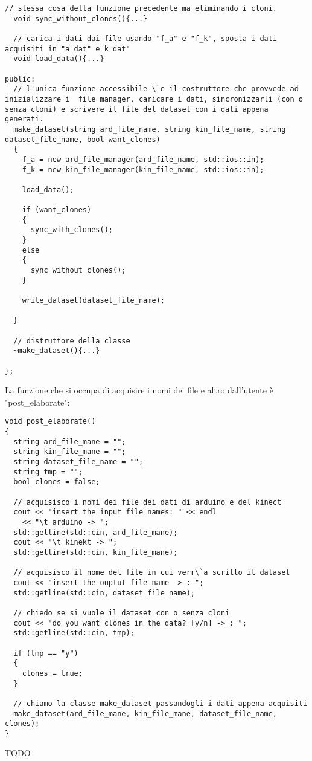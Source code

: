 \documentclass[10pt,a4paper]{article}
\begin{document}
\begin{lstlisting}[style=mycpp, caption=librerie usate, captionpos=b]
  // stessa cosa della funzione precedente ma eliminando i cloni.
  void sync_without_clones(){...}

  // carica i dati dai file usando "f_a" e "f_k", sposta i dati acquisiti in "a_dat" e k_dat"
  void load_data(){...}

public:
  // l'unica funzione accessibile \`e il costruttore che provvede ad inizializzare i  file manager, caricare i dati, sincronizzarli (con o senza cloni) e scrivere il file del dataset con i dati appena generati.
  make_dataset(string ard_file_name, string kin_file_name, string dataset_file_name, bool want_clones)
  {
    f_a = new ard_file_manager(ard_file_name, std::ios::in);
    f_k = new kin_file_manager(kin_file_name, std::ios::in);

    load_data();
    
    if (want_clones)
    {
      sync_with_clones();
    }
    else
    {
      sync_without_clones();
    }

    write_dataset(dataset_file_name);

  }

  // distruttore della classe
  ~make_dataset(){...}

};
\end{lstlisting}
La funzione che si occupa di acquisire i nomi dei file e altro dall'utente \`e "post\_elaborate":
\begin{lstlisting}[style=mycpp, caption=librerie usate, captionpos=b]
void post_elaborate()
{
  string ard_file_mane = "";
  string kin_file_mane = "";
  string dataset_file_name = "";
  string tmp = "";
  bool clones = false;
  
  // acquisisco i nomi dei file dei dati di arduino e del kinect
  cout << "insert the input file names: " << endl
    << "\t arduino -> ";
  std::getline(std::cin, ard_file_mane);
  cout << "\t kinekt -> ";
  std::getline(std::cin, kin_file_mane);

  // acquisisco il nome del file in cui verr\`a scritto il dataset
  cout << "insert the ouptut file name -> : ";
  std::getline(std::cin, dataset_file_name);

  // chiedo se si vuole il dataset con o senza cloni
  cout << "do you want clones in the data? [y/n] -> : ";
  std::getline(std::cin, tmp);

  if (tmp == "y")
  {
    clones = true;
  }
  
  // chiamo la classe make_dataset passandogli i dati appena acquisiti
  make_dataset(ard_file_mane, kin_file_mane, dataset_file_name, clones);
}
\end{lstlisting}



TODO
\end{document}
